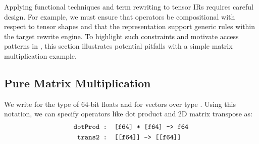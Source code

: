 Applying functional techniques
  and term rewriting to tensor IRs
  requires careful design.
For example,
  we must ensure that operators be compositional
  with respect to tensor shapes
  and that the representation support
  generic rules within the
  target rewrite engine.
To highlight such constraints and
  motivate access patterns in \g,
  this section illustrates potential pitfalls
  with a simple matrix multiplication example.

\subsection{Pure Matrix Multiplication}
\label{subsec:pure-matmul}

We write
   for the type of 64-bit floats and
  \tcd{[A]} for vectors over type .
Using this notation, we can specify operators like
  dot product and 2D matrix transpose as:
\begin{align*}
    \mathrm{\texttt{dotProd}} &
    \mathrm{\texttt{ : [f64] * [f64] -> f64}} \\
    \mathrm{\texttt{trans2}} &
    \mathrm{\texttt{ : [[f64]] -> [[f64]]}}
\end{align*} 






